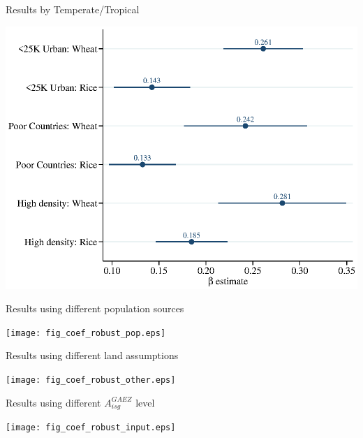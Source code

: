 \documentclass[10pt, xcolor=dvipsnames]{beamer}
\begin{document}
\begin{frame}{Results by Temperate/Tropical}
\begin{center}
\includegraphics[width=.9\textwidth]{fig_coef_crop_sub_base.eps}
\end{center}
\end{frame}

\begin{frame}{Results using different population sources}\label{pop}
\begin{center}
\texttt{[image: fig\_coef\_robust\_pop.eps]}
\end{center}
\hfill \hyperlink{popreg}{}
\end{frame}

\begin{frame}{Results using different land assumptions}\label{land}
\begin{center}
\texttt{[image: fig\_coef\_robust\_other.eps]}
\end{center}
\hfill \hyperlink{landreg}{}
\end{frame}

\begin{frame}{Results using different $A^{GAEZ}_{isg}$ level}\label{prod}
\begin{center}
\texttt{[image: fig\_coef\_robust\_input.eps]}
\end{center}
\hfill \hyperlink{prodreg}{}
\end{frame}
\end{document}
